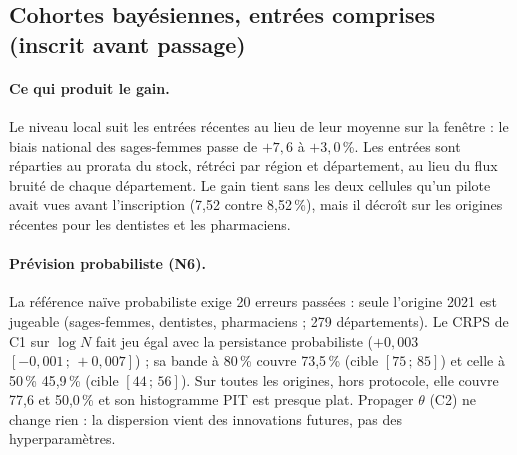 \documentclass[11pt]{article}
\begin{document}
\subsection{Cohortes bayésiennes, entrées comprises (inscrit avant passage)}
\begin{table}[h]
\centering\small
{}
\caption{Périmètre privé ; valeurs mesurées\mesure. C1 bat A0 dans 17 cellules profession
$\times$ origine sur 22\mesure.}
\end{table}

\paragraph{Ce qui produit le gain.} Le niveau local suit les entrées récentes au lieu de leur moyenne
sur la fenêtre : le biais national des sages-femmes passe de $+7{,}6$ à $+3{,}0$\,\%\mesure. Les
entrées sont réparties au prorata du stock, rétréci par région et département, au lieu du flux bruité
de chaque département. Le gain tient sans les deux cellules qu'un pilote avait vues avant l'inscription
(7,52 contre 8,52\,\%\mesure), mais il décroît sur les origines récentes pour les dentistes et les
pharmaciens.

\paragraph{Prévision probabiliste (N6).} La référence naïve probabiliste exige 20 erreurs passées :
seule l'origine 2021 est jugeable (sages-femmes, dentistes, pharmaciens ; 279 départements). Le CRPS
de C1 sur $\log N$ fait jeu égal avec la persistance probabiliste ($+0{,}003$
$[-0{,}001\,;\,+0{,}007]$\mesure) ; sa bande à 80\,\% couvre 73,5\,\%\mesure{} (cible $[75\,;\,85]$)
et celle à 50\,\% 45,9\,\%\mesure{} (cible $[44\,;\,56]$). Sur toutes les origines, hors protocole,
elle couvre 77,6 et 50,0\,\%\mesure{} et son histogramme PIT est presque plat. Propager $\theta$ (C2)
ne change rien : la dispersion vient des innovations futures, pas des hyperparamètres.
\end{document}
